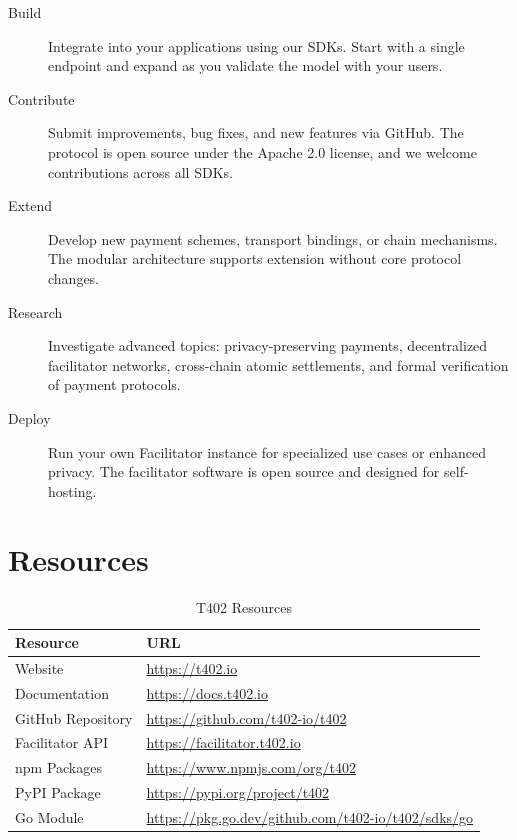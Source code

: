 \begin{description}
    \item[Build] Integrate \tprotocol{} into your applications using our SDKs. Start with a single endpoint and expand as you validate the model with your users.

    \item[Contribute] Submit improvements, bug fixes, and new features via GitHub. The protocol is open source under the Apache 2.0 license, and we welcome contributions across all SDKs.

    \item[Extend] Develop new payment schemes, transport bindings, or chain mechanisms. The modular architecture supports extension without core protocol changes.

    \item[Research] Investigate advanced topics: privacy-preserving payments, decentralized facilitator networks, cross-chain atomic settlements, and formal verification of payment protocols.

    \item[Deploy] Run your own Facilitator instance for specialized use cases or enhanced privacy. The facilitator software is open source and designed for self-hosting.
\end{description}

\section{Resources}
\label{sec:resources}

\begin{table}[htbp]
\centering
\caption{T402 Resources}
\label{tab:resources}
\begin{tabular}{l l}
\toprule
\textbf{Resource} & \textbf{URL} \\
\midrule
Website & \url{https://t402.io} \\
Documentation & \url{https://docs.t402.io} \\
GitHub Repository & \url{https://github.com/t402-io/t402} \\
Facilitator API & \url{https://facilitator.t402.io} \\
npm Packages & \url{https://www.npmjs.com/org/t402} \\
PyPI Package & \url{https://pypi.org/project/t402} \\
Go Module & \url{https://pkg.go.dev/github.com/t402-io/t402/sdks/go} \\
\bottomrule
\end{tabular}
\end{table}

